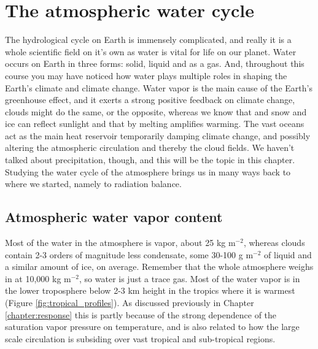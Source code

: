 \documentclass[12pt]{book}
\begin{document}
\chapter{The atmospheric water cycle}

The hydrological cycle on Earth is immensely complicated, and really it is a whole scientific field on it's own as water is vital for life on our planet. Water occurs on Earth in three forms: solid, liquid and as a gas. And, throughout this course you may have noticed how water plays multiple roles in shaping the Earth's climate and climate change. Water vapor is the main cause of the Earth's greenhouse effect, and it exerts a strong positive feedback on climate change, clouds might do the same, or the opposite, whereas we know that and snow and ice can reflect sunlight and that by melting amplifies warming. The vast oceans act as the main heat reservoir temporarily damping climate change, and possibly altering the atmospheric circulation and thereby the cloud fields. We haven't talked about precipitation, though, and this will be the topic in this chapter. 
Studying the water cycle of the atmosphere brings us in many ways back to where we started, namely to radiation balance. %


\section{Atmospheric water vapor content}
Most of the water in the atmosphere is vapor, about 25 kg m$^{-2}$, whereas clouds contain 2-3 orders of magnitude less condensate, some 30-100 g m$^{-2}$ of liquid and a similar amount of ice, on average. Remember that the whole atmosphere weighs in at 10,000 kg m$^{-2}$, so water is just a trace gas. Most of the water vapor is in the lower troposphere below 2-3 km height in the tropics where it is warmest (Figure \ref{fig:tropical_profiles}). As discussed previously in Chapter \ref{chapter:response} this is partly because of the strong dependence of the saturation vapor pressure on temperature, and is also related to how the large scale circulation is subsiding over vast tropical and sub-tropical regions. %
\end{document}
